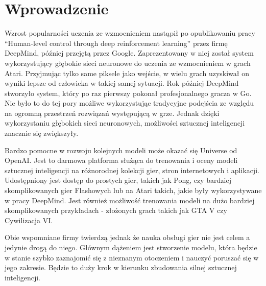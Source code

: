 \documentclass[preprint,12pt]{elsarticle}
\begin{document}

\section{Wprowadzenie}
\label{S:1}

Wzrost popularności uczenia ze wzmocnieniem nastąpił po opublikowaniu pracy ``Human-level control through deep reinforcement learning'' \cite{DeepMind:2015} przez firmę DeepMind, później przejętą przez Google. Zaprezentowany w niej został system wykorzystujący głębokie sieci neuronowe do uczenia ze wzmocnieniem w grach Atari. Przyjmując tylko same piksele jako wejście, w wielu grach uzyskiwał on wyniki lepsze od człowieka w takiej samej sytuacji. Rok później DeepMind stworzyło system, który po raz pierwszy pokonał profesjonalnego gracza w Go. Nie było to do tej pory możliwe wykorzystując tradycyjne podejścia ze względu na ogromną przestrzeń rozwiązań występującą w grze. Jednak dzięki wykorzystaniu głębokich sieci neuronowych, możliwości sztucznej inteligencji znacznie się zwiększyły. 

Bardzo pomocne w rozwoju kolejnych modeli może okazać się Universe od OpenAI. Jest to darmowa platforma służąca do trenowania i oceny modeli sztucznej inteligencji na różnorodnej kolekcji gier, stron internetowych i aplikacji. Udostępniony jest dostęp do prostych gier, takich jak Pong, czy bardziej skomplikowanych gier Flashowych lub na Atari takich, jakie były wykorzystywane w pracy DeepMind. Jest również możliwość trenowania modeli na dużo bardziej skomplikowanych przykładach - złożonych grach takich jak GTA V czy Cywilizacja VI.

Obie wspomniane firmy twierdzą jednak że nauka obsługi gier nie jest celem a jedynie drogą do niego. Głównym dążeniem jest stworzenie modelu,  która będzie w stanie szybko zaznajomić się z nieznanym otoczeniem i nauczyć poruszać się w jego zakresie. Będzie to duży krok w kierunku zbudowania silnej sztucznej inteligencji.
\end{document}
